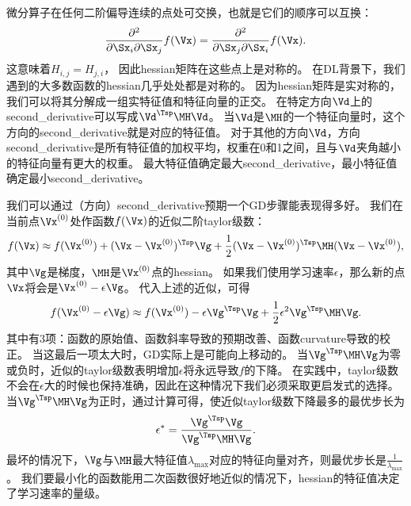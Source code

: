 
微分算子在任何二阶偏导连续的点处可交换，也就是它们的顺序可以互换：
\begin{align}
 \frac{\partial^2}{\partial \Sx_i \partial \Sx_j} f(\Vx) = \frac{\partial^2}{\partial \Sx_j\partial \Sx_i} f(\Vx) .
\end{align}
这意味着$H_{i,j} = H_{j,i}$， 因此\gls{hessian}矩阵在这些点上是对称的。
在\gls{DL}背景下，我们遇到的大多数函数的\gls{hessian}几乎处处都是对称的。
因为\gls{hessian}矩阵是实对称的，我们可以将其分解成一组实特征值和特征向量的正交。
在特定方向$\Vd$上的\gls{second_derivative}可以写成$\Vd^\Tsp \MH \Vd$。
当$\Vd$是$\MH$的一个特征向量时，这个方向的\gls{second_derivative}就是对应的特征值。
对于其他的方向$\Vd$，方向\gls{second_derivative}是所有特征值的加权平均，权重在0和1之间，且与$\Vd$夹角越小的特征向量有更大的权重。
最大特征值确定最大\gls{second_derivative}，最小特征值确定最小\gls{second_derivative}。


我们可以通过（方向）\gls{second_derivative}预期一个\gls{GD}步骤能表现得多好。
我们在当前点$\Vx^{(0)}$处作函数$f(\Vx)$的近似二阶\gls{taylor}级数：
\begin{align}
 f(\Vx) \approx f(\Vx^{(0)}) + (\Vx - \Vx^{(0)})^\Tsp \Vg + 
 \frac{1}{2}  (\Vx - \Vx^{(0)})^\Tsp \MH  (\Vx - \Vx^{(0)}),
\end{align}
其中$\Vg$是梯度，$\MH$是$ \Vx^{(0)}$点的\gls{hessian}。
如果我们使用学习速率$\epsilon$，那么新的点$\Vx$将会是$\Vx^{(0)}-\epsilon \Vg$。
代入上述的近似，可得
\begin{align}
\label{eq:4.9}
 f(\Vx^{(0)} - \epsilon \Vg ) \approx f(\Vx^{(0)})  - \epsilon \Vg^\Tsp \Vg + \frac{1}{2} \epsilon^2 \Vg^\Tsp \MH  \Vg.
\end{align}
其中有3项：函数的原始值、函数斜率导致的预期改善、函数\gls{curvature}导致的校正。
当这最后一项太大时，\gls{GD}实际上是可能向上移动的。
当$\Vg^\Tsp \MH  \Vg$为零或负时，近似的\gls{taylor}级数表明增加$\epsilon$将永远导致$f$的下降。
在实践中，\gls{taylor}级数不会在$\epsilon$大的时候也保持准确，因此在这种情况下我们必须采取更启发式的选择。
当$\Vg^\Tsp \MH  \Vg$为正时，通过计算可得，使近似\gls{taylor}级数下降最多的最优步长为
\begin{align}
 \epsilon^* = \frac{ \Vg^\Tsp \Vg}{ \Vg^\Tsp \MH  \Vg} .
\end{align}
最坏的情况下，$\Vg$与$\MH$最大特征值$\lambda_{\max}$对应的特征向量对齐，则最优步长是$\frac{1}{\lambda_{\max}}$。
我们要最小化的函数能用二次函数很好地近似的情况下，\gls{hessian}的特征值决定了学习速率的量级。

